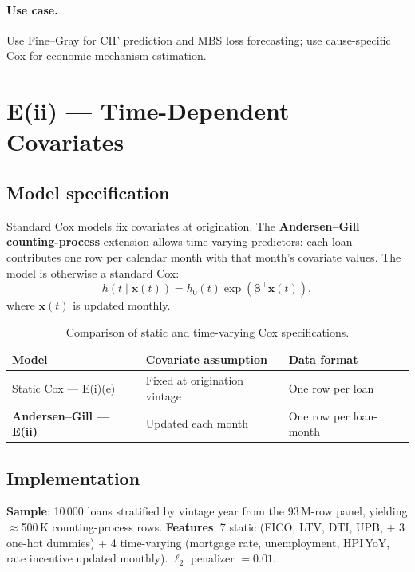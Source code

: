 \documentclass[11pt,a4paper]{article}
\begin{document}
\paragraph{Use case.}  Use Fine--Gray for CIF prediction and MBS loss
forecasting; use cause-specific Cox for economic mechanism estimation.

\section{E(ii) --- Time-Dependent Covariates}

\subsection{Model specification}

Standard Cox models fix covariates at origination.  The
\textbf{Andersen--Gill counting-process} extension allows time-varying
predictors: each loan contributes one row per calendar month with that
month's covariate values.  The model is otherwise a standard Cox:
\begin{equation}
  h(t \mid \mathbf{x}(t)) = h_0(t)\exp(\boldsymbol{\beta}^\top \mathbf{x}(t)),
  \label{eq:ag}
\end{equation}
where $\mathbf{x}(t)$ is updated monthly.

\begin{table}[h]
\centering
\caption{Comparison of static and time-varying Cox specifications.}
\label{tab:ag_compare}
\small
\begin{tabular}{lll}
\toprule
\textbf{Model} & \textbf{Covariate assumption} & \textbf{Data format} \\
\midrule
Static Cox --- E(i)(e)  & Fixed at origination vintage & One row per loan \\
\textbf{Andersen--Gill --- E(ii)} & Updated each month & One row per loan-month \\
\bottomrule
\end{tabular}
\end{table}

\subsection{Implementation}

\textbf{Sample}: 10\,000 loans stratified by vintage year from the
93\,M-row panel, yielding $\approx$500\,K counting-process rows.
\textbf{Features}: 7 static (FICO, LTV, DTI, UPB, + 3 one-hot dummies)
+ 4 time-varying (mortgage rate, unemployment, HPI\,YoY, rate incentive
updated monthly).  $\ell_2$ penalizer $= 0.01$.
\end{document}

